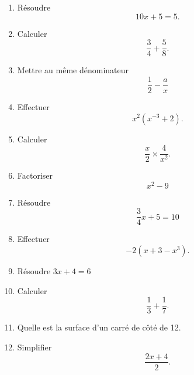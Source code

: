 \begin{exercice}
\begin{multicols}{2}
\begin{enumerate}
        \item
            Résoudre
            \begin{equation}
                10x+5=5.
            \end{equation}
        \item
            Calculer
            \begin{equation}
                \frac{ 3 }{ 4 }+\frac{ 5 }{ 8 }.
            \end{equation}
        \item
            Mettre au même dénominateur
            \begin{equation}
                \frac{ 1 }{ 2 }-\frac{ a }{ x }
            \end{equation}
        \item
            Effectuer
            \begin{equation}
                x^2(x^{-3}+2).
            \end{equation}

        \item
            Calculer
            \begin{equation}
                \frac{ x }{ 2 }\times\frac{ 4 }{ x^2 }.
            \end{equation}
        \item
            Factoriser
            \begin{equation}
                x^2-9
            \end{equation}
        \item
            Résoudre
            \begin{equation}
                \frac{ 3 }{ 4 }x+5=10
            \end{equation}
        \item
            Effectuer
            \begin{equation}
                -2(x+3-x^3).
            \end{equation}

        \item
            Résoudre \( 3x+4=6\)
        \item
            Calculer
            \begin{equation}
                \frac{1}{ 3 }+\frac{1}{ 7 }.
            \end{equation}
        \item
            Quelle est la surface d'un carré de côté de \unit{12}{\centi\meter\squared}.
        \item
            Simplifier
            \begin{equation}
                \frac{ 2x+4 }{ 2 }.
            \end{equation}



\end{enumerate}
\end{multicols}
\end{exercice}
